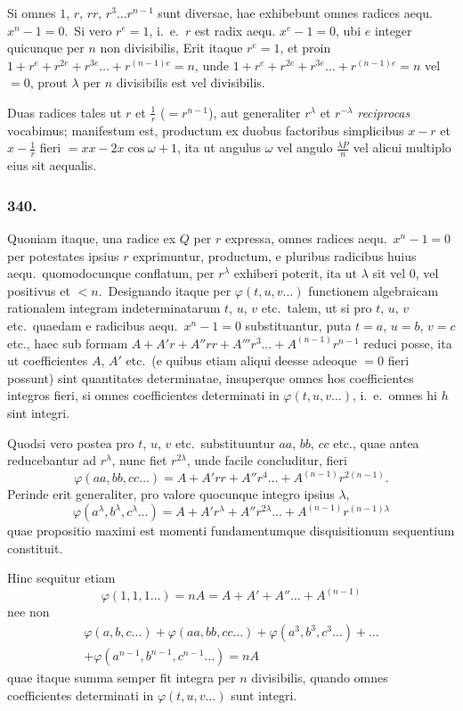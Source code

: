 \documentclass[12pt,a4paper]{article}
\theoremstyle{plain}
\theoremstyle{definition}
\theoremstyle{remark}
\begin{document}
Si omnes $1$, $r$, $rr$, $r^3\dots r^{n-1}$ sunt diversae, hae exhibebunt omnes
radices aequ.\ $x^n-1=0$.\ Si vero $r^e=1$, i.\ e.\ $r$ est radix aequ.
$x^e-1=0$, ubi $e$ integer quicunque per $n$ non divisibilis, Erit itaque
$r^e=1$, et proin $1+r^e+r^{2e}+r^{3e}\dots+r^{(n-1)e}=n$, unde
$1+r^e+r^{2e}+r^{3e}\dots+r^{(n-1)e} = n$ vel $=0$, prout $\lambda$ per $n$
divisibilis est vel divisibilis.

Duas radices tales ut $r$ et $\frac{1}{r}$ ($=r^{n-1}$), aut generaliter $r^\lambda$ et
$r^{-\lambda}$ \emph{reciprocas} vocabimus; manifestum est, productum ex duobus
factoribus simplicibus $x-r$ et $x-\frac{1}{r}$ fieri $=xx-2x\cos\omega+1$, ita ut
angulus $\omega$ vel angulo $\frac{\lambda P}{n}$ vel alicui multiplo eius sit aequalis.

\subsubsection*{340.}

Quoniam itaque, una radice ex $Q$ per $r$ expressa, omnes radices
aequ.\ $x^n-1=0$ per potestates ipsius $r$ exprimuntur, productum, e
pluribus radicibus huius aequ.\ quomodocunque conflatum, per $r^\lambda$
exhiberi poterit, ita ut $\lambda$ sit vel 0, vel positivus et $<n$.\ Designando
itaque per $\varphi(t,u,v\dots)$ functionem algebraicam rationalem integram
indeterminatarum $t$, $u$, $v$ etc.\ talem, ut si pro $t$, $u$, $v$ etc.\ quaedam e
radicibus aequ.\ $x^n-1=0$ substituantur, puta $t=a$, $u=b$, $v=c$
etc., haec sub formam $A+A'r+A''rr+A'''r^3\dots+A^{(n-1)}r^{n-1}$
reduci posse, ita ut coefficientes $A$, $A'$ etc.\ (e quibus etiam aliqui deesse
adeoque $=0$ fieri possunt) sint quantitates determinatae, insuperque omnes
hos coefficientes integros fieri, si omnes coefficientes determinati in
$\varphi(t,u,v\dots)$, i.\ e.\ omnes hi $h$ sint integri.

Quodsi vero postea pro $t$, $u$, $v$ etc.\ substituuntur $aa$, $bb$, $cc$
etc., quae antea reducebantur ad $r^\lambda$, nunc fiet $r^{2\lambda}$, unde facile concluditur,
fieri
\[\varphi(aa,bb,cc\dots) = A+A'rr+A''r^4\dots+A^{(n-1)}r^{2(n-1)}.\]
Perinde erit generaliter, pro valore quocunque integro ipsius $\lambda$,
\[\varphi(a^\lambda,b^\lambda,c^\lambda\dots) = A+A'r^\lambda+A''r^{2\lambda}\dots+A^{(n-1)}r^{(n-1)\lambda}\]
quae propositio maximi est momenti fundamentumque disquisitionum
sequentium constituit.

Hinc sequitur etiam
\[\varphi(1,1,1\dots) = nA = A+A'+A''\dots+A^{(n-1)}\]
nee non
\begin{multline*}
\varphi(a,b,c\dots) + \varphi(aa,bb,cc\dots) + \varphi(a^3,b^3,c^3\dots) + \dots \\
+ \varphi(a^{n-1},b^{n-1},c^{n-1}\dots) = nA
\end{multline*}
quae itaque summa semper fit integra per $n$ divisibilis, quando omnes
coefficientes determinati in $\varphi(t,u,v\dots)$ sunt integri.
\end{document}
